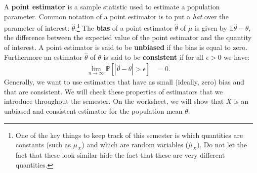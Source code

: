 \documentclass{tufte-handout}
\newcommand{\E}{\mathbb{E}}
\newcommand{\Prob}{\mathbb{P}}
\begin{document}
A \textbf{point estimator} is a sample statistic used to estimate a population
parameter. Common notation of a point estimator is to put a \textit{hat} over
the parameter of interest: $\hat{\theta}$.\footnote{
  One of the key things to keep track of this semester is which quantities are
  constants (such as $\mu_X$) and which are random variables ($\hat{\mu}_X$).
  Do not let the fact that these look similar hide the fact that these are
  very different quantities.
}
The \textbf{bias} of a point estimator $\hat{\theta}$ of $\mu$ is given by 
$\E\hat{\theta} - \theta$, the difference between the expected value of the point
estimator and the quantity of interest. A point estimator is said to be
\textbf{unbiased} if the bias is equal to zero. Furthermore an estimator
$\hat{\theta}$ of $\theta$ is said to be \textbf{consistent} if for all
$\epsilon > 0$ we have:
\begin{align*}
\lim_{n\rightarrow\infty}\Prob\left[ |\hat{\theta} - \theta| > \epsilon \right] &= 0.
\end{align*}
Generally, we want to use estimators that have as small (ideally, zero) bias and that
are consistent. We will check these properties of estimators that we introduce throughout
the semester. On the worksheet, we will show that $\bar{X}$ is an unbiased and consistent
estimator for the population mean $\theta$. 
\end{document}
